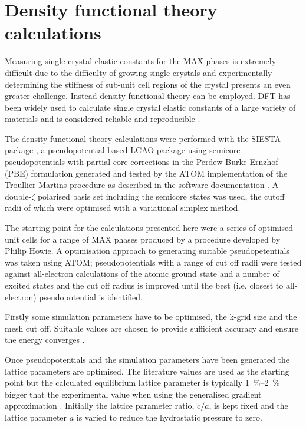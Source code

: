 \section{Density functional theory calculations}
\label{sec:DFT_method}



Measuring single crystal elastic constants for the MAX phases is extremely difficult due to the difficulty of growing single crystals and experimentally determining the stiffness of sub-unit cell regions of the crystal presents an even greater challenge. Instead density functional theory can be employed. DFT has been widely used to calculate single crystal elastic constants of a large variety of materials and is considered reliable and reproducible \cite{Lejaeghere2016}. 

The density functional theory calculations were performed with the SIESTA package \cite{soler2002}, a pseudopotential based LCAO package using semicore pseudopotentials with partial core corrections in the Perdew-Burke-Ernzhof (PBE) formulation generated and tested by the ATOM implementation \cite{soler2002} of the Troullier-Martins procedure \cite{Troullier1991,Troullier1991a} as described in the software documentation \cite{ATOM_manual}. A double-$\zeta$ polarised basis set including the semicore states was used, the cutoff radii of which were optimised with a variational simplex method.

The starting point for the calculations presented here were a series of optimised unit cells for a range of MAX phases produced by a procedure developed by Philip Howie. A optimisation approach to generating suitable pseudopetentials was taken using ATOM; pseudopotentials with a range of cut off radii were tested against all-electron calculations of the atomic ground state and a number of excited states and the cut off radius is improved until the best (i.e. closest to all-electron) pseudopotential is identified. 

Firstly some simulation parameters have to be optimised, the k-grid size and the mesh cut off. Suitable values are chosen to provide sufficient accuracy and ensure the energy converges \cite{SIESTA_manual}.

Once pseudopotentials and the simulation parameters have been generated the lattice parameters are optimised. The literature values are used as the starting point but the calculated equilibrium lattice parameter is typically \SIrange{1}{2}{\percent} bigger that the experimental value when using the generalised gradient approximation \cite{Staroverov2004,Wu2006}. Initially the lattice parameter ratio, $c/a$, is kept fixed and the lattice parameter $a$ is varied to reduce the hydrostatic pressure to zero.


